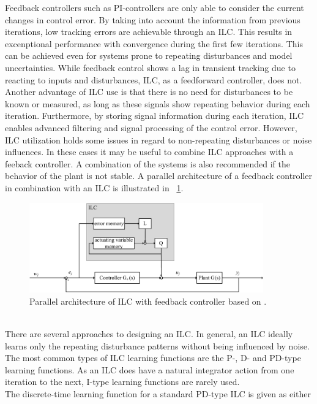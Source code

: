  Feedback controllers such as PI-controllers are only able to consider the current changes in control error. By taking into account the information from previous iterations, low tracking errors are achievable through an ILC. This results in excenptional performance with convergence during the first few iterations. This can be achieved even for systems prone to repeating disturbances and model uncertainties. While feedback control shows a lag in transient tracking due to reacting to inputs and disturbances, ILC, as a feedforward controller, does not. Another advantage of ILC use is that there is no need for disturbances to be known or measured, as long as these signals show repeating behavior during each iteration. Furthermore, by storing signal information during each iteration, ILC enables advanced filtering and signal processing of the control error. However, ILC utilization holds some issues in regard to non-repeating disturbances or noise influences. In these cases it may be useful to combine ILC approaches with a feeback controller. A combination of the systems is also recommended if the behavior of the plant is not stable. \cite{ILC2} A parallel architecture of a feedback controller in combination with an ILC is illustrated in \figurename~\ref{fig:ILC_parallel}.
 \begin{figure}[h]
    \centering
    \includegraphics[width=0.9\textwidth]{images/ILC_parallel.pdf}
    \caption[Parallel architecture of ILC with feedback controller]{Parallel architecture of ILC with feedback controller based on \cite{ILC2}.}
    \label{fig:ILC_parallel}
  \end{figure}
\\There are several approaches to designing an ILC. In general, an ILC ideally learns only the repeating disturbance patterns without being influenced by noise. The most common types of ILC learning functions are the P-, D- and PD-type learning functions. As an ILC does have a natural integrator action from one iteration to the next, I-type learning functions are rarely used.
\\The discrete-time learning function for a standard PD-type ILC is given as either
